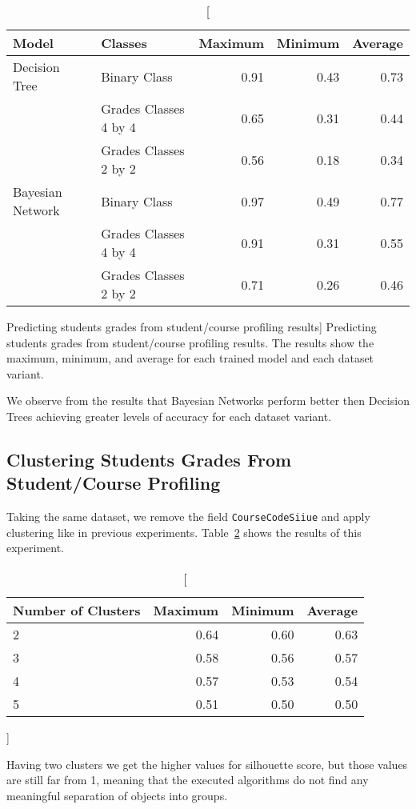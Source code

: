 \begin{table}[h!]
    \centering

    \begin{tabular}{| l | l | r | r | r |}
        \hline
        \textbf{Model} & \textbf{Classes} & \textbf{Maximum} & \textbf{Minimum} & \textbf{Average} \\ \hline
        Decision Tree    & Binary Class          & 0.91 & 0.43 & 0.73 \\
                         & Grades Classes 4 by 4 & 0.65 & 0.31 & 0.44 \\
                         & Grades Classes 2 by 2 & 0.56 & 0.18 & 0.34 \\ \hline
        Bayesian Network & Binary Class          & 0.97 & 0.49 & 0.77 \\
                         & Grades Classes 4 by 4 & 0.91 & 0.31 & 0.55 \\
                         & Grades Classes 2 by 2 & 0.71 & 0.26 & 0.46 \\ \hline
    \end{tabular}

    \caption
        [Predicting students grades from student/course profiling results]
        {Predicting students grades from student/course profiling results. The
        results show the maximum, minimum, and average for each trained model
        and each dataset variant.}

    \label{tab:exp_005_res}
\end{table}

We observe from the results that Bayesian Networks perform better then Decision
Trees achieving greater levels of accuracy for each dataset variant.

\subsection{Clustering Students Grades From Student/Course Profiling}

Taking the same dataset, we remove the field \texttt{CourseCodeSiiue} and apply
clustering like in previous experiments. Table~\ref{tab:exp_006_res} shows the
results of this experiment.

\begin{table}[h!]
    \centering

    \begin{tabular}{| l | r | r | r |}
        \hline
        \textbf{Number of Clusters} & \textbf{Maximum} & \textbf{Minimum} & \textbf{Average} \\ \hline
        2 & 0.64 & 0.60 & 0.63 \\ \hline
        3 & 0.58 & 0.56 & 0.57 \\ \hline
        4 & 0.57 & 0.53 & 0.54 \\ \hline
        5 & 0.51 & 0.50 & 0.50 \\ \hline
    \end{tabular}

    \caption
        []
        {}

    \label{tab:exp_006_res}
\end{table}

Having two clusters we get the higher values for silhouette score, but those
values are still far from 1, meaning that the executed algorithms do not find
any meaningful separation of objects into groups.
